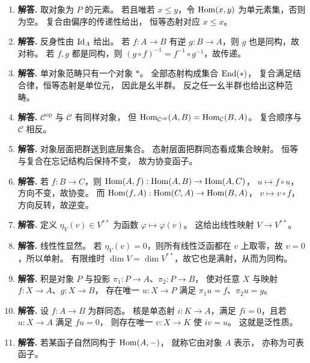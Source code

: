 \begin{enumerate}[label=\textbf{A.\arabic*.}, leftmargin=*, itemsep=1em]
\item \textbf{解答.} 取对象为 $P$ 的元素。
若且唯若 $x\le y$，令 $\mathrm{Hom}(x,y)$ 为单元素集，否则为空。
复合由偏序的传递性给出，
恒等态射对应 $x\le x$。

\item \textbf{解答.} 反身性由 $\mathrm{Id}_A$ 给出。
若 $f:A\to B$ 有逆 $g:B\to A$，则 $g$ 也是同构，故对称。
若 $f,g$ 都是同构，则 $(g\circ f)^{-1}=f^{-1}\circ g^{-1}$，故传递。

\item \textbf{解答.} 单对象范畴只有一个对象 $\ast$。
全部态射构成集合 $\mathrm{End}(\ast)$，
复合满足结合律，恒等态射是单位元，
因此是幺半群。
反之任一幺半群也给出这种范畴。

\item \textbf{解答.} $\mathcal{C}^{\mathrm{op}}$ 与 $\mathcal{C}$ 有同样对象，
但
$\mathrm{Hom}_{\mathcal{C}^{\mathrm{op}}}(A,B)=\mathrm{Hom}_{\mathcal{C}}(B,A)$。
复合顺序与 $\mathcal{C}$ 相反。

\item \textbf{解答.} 对象层面把群送到底层集合。
态射层面把群同态看成集合映射。
恒等与复合在忘记结构后保持不变，
故为协变函子。

\item \textbf{解答.} 若 $f:B\to C$，则
$\mathrm{Hom}(A,f):\mathrm{Hom}(A,B)\to\mathrm{Hom}(A,C)$，
$u\mapsto f\circ u$，方向不变，故协变。
而
$\mathrm{Hom}(f,A):\mathrm{Hom}(C,A)\to\mathrm{Hom}(B,A)$，
$v\mapsto v\circ f$，方向反转，故逆变。

\item \textbf{解答.} 定义
$\eta_V(v)\in V^{**}$ 为函数
$\varphi\mapsto \varphi(v)$。
这给出线性映射 $V\to V^{**}$。

\item \textbf{解答.} 线性性显然。
若 $\eta_V(v)=0$，则所有线性泛函都在 $v$ 上取零，故 $v=0$，所以单射。
有限维时 $\dim V=\dim V^{**}$，故它也是满射，从而为同构。

\item \textbf{解答.} 积是对象 $P$ 与投影 $\pi_1:P\to A$、$\pi_2:P\to B$，
使对任意 $X$ 与映射 $f:X\to A$、$g:X\to B$，
存在唯一 $u:X\to P$ 满足 $\pi_1u=f$、$\pi_2u=g$。

\item \textbf{解答.} 设 $f:A\to B$ 为群同态。
核是单态射 $i:K\to A$，满足 $fi=0$，且若 $u:X\to A$ 满足 $fu=0$，
则存在唯一 $v:X\to K$ 使 $iv=u$。
这就是泛性质。

\item \textbf{解答.} 若某函子自然同构于 $\mathrm{Hom}(A,-)$，
就称它由对象 $A$ 表示，
亦称为可表函子。


\end{enumerate}

